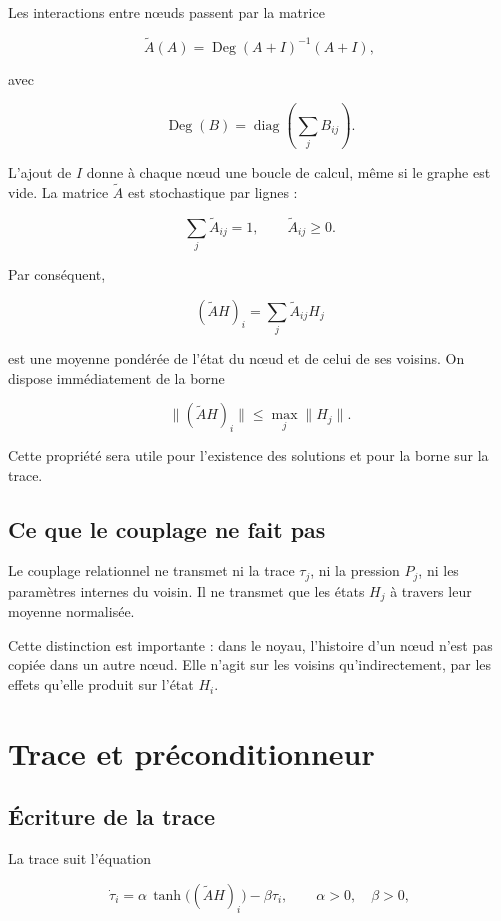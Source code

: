 Les interactions entre nœuds passent par la matrice

\[
\widetilde A(A)
=
\operatorname{Deg}(A+I)^{-1}(A+I),
\]

avec

\[
\operatorname{Deg}(B)
=
\operatorname{diag}\!\left(\sum_j B_{ij}\right).
\]

L'ajout de \(I\) donne à chaque nœud une boucle de calcul, même si le graphe est vide. La matrice \(\widetilde A\) est stochastique par lignes :

\[
\sum_j \widetilde A_{ij}=1,
\qquad
\widetilde A_{ij}\geq 0.
\]

Par conséquent,

\[
(\widetilde A H)_i
=
\sum_j \widetilde A_{ij}H_j
\]

est une moyenne pondérée de l'état du nœud et de celui de ses voisins. On dispose immédiatement de la borne

\[
\|(\widetilde A H)_i\|
\leq
\max_j \|H_j\|.
\]

Cette propriété sera utile pour l'existence des solutions et pour la borne sur la trace.

\section{Ce que le couplage ne fait pas}\label{t1-ce-que-le-couplage-ne-fait-pas}

Le couplage relationnel ne transmet ni la trace \(\tau_j\), ni la pression \(P_j\), ni les paramètres internes du voisin. Il ne transmet que les états \(H_j\) à travers leur moyenne normalisée.

Cette distinction est importante : dans le noyau, l'histoire d'un nœud n'est pas copiée dans un autre nœud. Elle n'agit sur les voisins qu'indirectement, par les effets qu'elle produit sur l'état \(H_i\).

\chapter{Trace et préconditionneur}\label{t1-trace-et-preconditionneur}

\section{Écriture de la trace}\label{t1-ecriture-de-la-trace}

La trace suit l'équation

\[
\dot\tau_i
=
\alpha\,\tanh\!\bigl((\widetilde A H)_i\bigr)
-
\beta\tau_i,
\qquad
\alpha>0,
\quad
\beta>0,
\]

